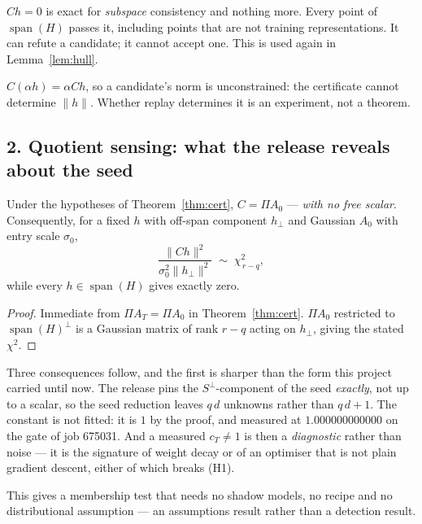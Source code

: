\begin{remark}\label{rem:rejection}
$Ch=0$ is exact for \emph{subspace} consistency and nothing more. Every point of
$\operatorname{span}(H)$ passes it, including points that are not training representations. It can
refute a candidate; it cannot accept one. This is used again in Lemma~\ref{lem:hull}.
\end{remark}

\begin{remark}[homogeneity]
$C(\alpha h)=\alpha Ch$, so a candidate's norm is unconstrained: the certificate cannot determine
$\|h\|$. Whether replay determines it is an experiment, not a theorem.
\end{remark}

\subsection*{2. Quotient sensing: what the release reveals about the seed}

\begin{proposition}\label{prop:sensing}
Under the hypotheses of Theorem~\ref{thm:cert}, $C=\Pi A_0$ --- \emph{with no free scalar}.
Consequently, for a fixed $h$ with off-span component $h_\perp$ and Gaussian $A_0$ with entry scale
$\sigma_0$,
\[
  \frac{\|Ch\|^{2}}{\sigma_0^{2}\|h_\perp\|^{2}}\;\sim\;\chi^{2}_{\,r-q},
\]
while every $h\in\operatorname{span}(H)$ gives exactly zero.
\end{proposition}

\begin{proof}
Immediate from $\Pi A_T=\Pi A_0$ in Theorem~\ref{thm:cert}. $\Pi A_0$ restricted to
$\operatorname{span}(H)^{\perp}$ is a Gaussian matrix of rank $r-q$ acting on $h_\perp$, giving the
stated $\chi^{2}$.
\end{proof}

Three consequences follow, and the first is sharper than the form this project carried until now.
The release pins the $S^{\perp}$-component of the seed \emph{exactly}, not up to a scalar, so the
seed reduction leaves $q\,d$ unknowns rather than $q\,d+1$. The constant is not fitted: it is $1$ by
the proof, and measured at $1.000000000000$ on the gate of job 675031. And a measured $c_T\neq1$ is
then a \emph{diagnostic} rather than noise --- it is the signature of weight decay or of an optimiser
that is not plain gradient descent, either of which breaks (H1).

This gives a membership test that needs no shadow models, no recipe and no distributional
assumption --- an assumptions result rather than a detection result.

